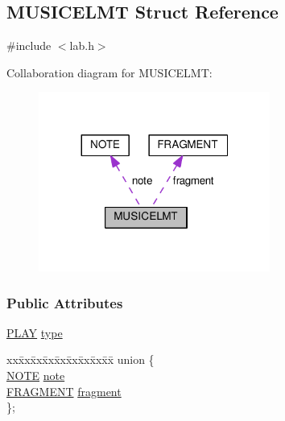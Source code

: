 \hypertarget{structMUSICELMT}{\subsection{M\+U\+S\+I\+C\+E\+L\+M\+T Struct Reference}
\label{structMUSICELMT}
}


{\ttfamily \#include $<$lab.\+h$>$}



Collaboration diagram for M\+U\+S\+I\+C\+E\+L\+M\+T\+:\nopagebreak
\begin{figure}[H]
\begin{center}
\leavevmode
\includegraphics[width=215pt]{structMUSICELMT__coll__graph}
\end{center}
\end{figure}
\subsubsection*{Public Attributes}
\begin{DoxyCompactItemize}
\item 
\hyperlink{lab_8h_a41c816c739b4ab01c73879f01ae63880}{P\+L\+A\+Y} \hyperlink{structMUSICELMT_aa9a541d279b1a98b190c1968217ad37f}{type}
\item 
\begin{tabbing}
xx\=xx\=xx\=xx\=xx\=xx\=xx\=xx\=xx\=\kill
union \{\\
\>\hyperlink{structNOTE}{NOTE} \hyperlink{structMUSICELMT_a662fdb18330107012ed8902725b08e5c}{note}\\
\>\hyperlink{structFRAGMENT}{FRAGMENT} \hyperlink{structMUSICELMT_ae418bce8087e7510ad8563a87b4c1c63}{fragment}\\
\}; \\

\end{tabbing}\end{DoxyCompactItemize}


